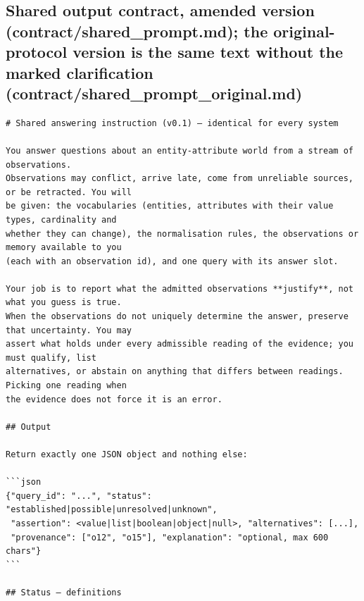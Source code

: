 \subsection*{Shared output contract, amended version (contract/shared\_prompt.md); the original-protocol version is the same text without the marked clarification (contract/shared\_prompt\_original.md)}
{\scriptsize\begin{verbatim}
# Shared answering instruction (v0.1) — identical for every system

You answer questions about an entity-attribute world from a stream of observations.
Observations may conflict, arrive late, come from unreliable sources, or be retracted. You will
be given: the vocabularies (entities, attributes with their value types, cardinality and
whether they can change), the normalisation rules, the observations or memory available to you
(each with an observation id), and one query with its answer slot.

Your job is to report what the admitted observations **justify**, not what you guess is true.
When the observations do not uniquely determine the answer, preserve that uncertainty. You may
assert what holds under every admissible reading of the evidence; you must qualify, list
alternatives, or abstain on anything that differs between readings. Picking one reading when
the evidence does not force it is an error.

## Output

Return exactly one JSON object and nothing else:

```json
{"query_id": "...", "status": "established|possible|unresolved|unknown",
 "assertion": <value|list|boolean|object|null>, "alternatives": [...],
 "provenance": ["o12", "o15"], "explanation": "optional, max 600 chars"}
```

## Status — definitions


\end{verbatim}}
